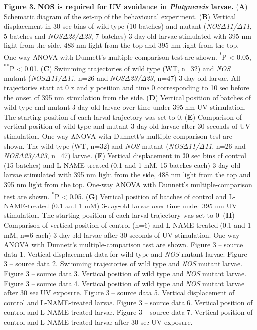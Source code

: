 \documentclass[
  11pt,
  letterpaper,
  DIV=11,
  numbers=noendperiod]{scrartcl}
\begin{document}
\textbf{Figure 3. NOS is required for UV avoidance in \emph{Platynereis}
larvae.} (\textbf{A}) Schematic diagram of the set-up of the behavioural
experiment. (\textbf{B}) Vertical displacement in 30 sec bins of wild
type (10 batches) and mutant (\emph{NOSΔ11/Δ11}, 5 batches and
\emph{NOSΔ23/Δ23}, 7 batches) 3-day-old larvae stimulated with 395 nm
light from the side, 488 nm light from the top and 395 nm light from the
top. One-way ANOVA with Dunnett's multiple-comparison test are shown.
\textsuperscript{*}P \textless{} 0.05, \textsuperscript{**}P \textless{}
0.01. (\textbf{C}) Swimming trajectories of wild type (WT, n=32) and
\emph{NOS} mutant (\emph{NOSΔ11/Δ11}, n=26 and \emph{NOSΔ23/Δ23}, n=47)
3-day-old larvae. All trajectories start at 0 x and y position and time
0 corresponding to 10 sec before the onset of 395 nm stimulation from
the side. (\textbf{D}) Vertical position of batches of wild type and
mutant 3-day-old larvae over time under 395 nm UV stimulation. The
starting position of each larval trajectory was set to 0. (\textbf{E})
Comparison of vertical position of wild type and mutant 3-day-old larvae
after 30 seconds of UV stimulation. One-way ANOVA with Dunnett's
multiple-comparison test are shown. The wild type (WT, n=32) and
\emph{NOS} mutant (\emph{NOSΔ11/Δ11}, n=26 and \emph{NOSΔ23/Δ23}, n=47)
larvae. (\textbf{F}) Vertical displacement in 30 sec bins of control (15
batches) and L-NAME-treated (0.1 and 1 mM, 15 batches each) 3-day-old
larvae stimulated with 395 nm light from the side, 488 nm light from the
top and 395 nm light from the top. One-way ANOVA with Dunnett's
multiple-comparison test are shown. \textsuperscript{*}P \textless{}
0.05. (\textbf{G}) Vertical position of batches of control and
L-NAME-treated (0.1 and 1 mM) 3-day-old larvae over time under 395 nm UV
stimulation. The starting position of each larval trajectory was set to
0. (\textbf{H}) Comparison of vertical position of control (n=6) and
L-NAME-treated (0.1 and 1 mM, n=6 each) 3-day-old larvae after 30
seconds of UV stimulation. One-way ANOVA with Dunnett's
multiple-comparison test are shown. Figure 3 -- source data 1. Vertical
displacement data for wild type and \emph{NOS} mutant larvae. Figure 3
-- source data 2. Swimming trajectories of wild type and \emph{NOS}
mutant larvae. Figure 3 -- source data 3. Vertical position of wild type
and \emph{NOS} mutant larvae. Figure 3 -- source data 4. Vertical
position of wild type and \emph{NOS} mutant larvae after 30 sec UV
exposure. Figure 3 -- source data 5. Vertical displacement of control
and L-NAME-treated larvae. Figure 3 -- source data 6. Vertical position
of control and L-NAME-treated larvae. Figure 3 -- source data 7.
Vertical position of control and L-NAME-treated larvae after 30 sec UV
exposure.
\end{document}
